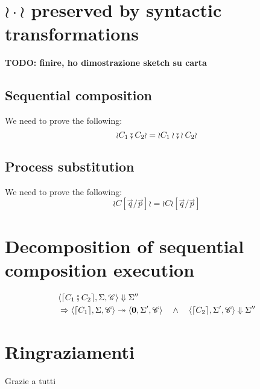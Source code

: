 \documentclass[12pt,a4paper,twoside]{book}
\begin{document}
\begin{appendices}
\chapter{$\wr \cdot \wr$ preserved by syntactic transformations}
\label{appdix:A}
\textbf{TODO: finire, ho dimostrazione sketch su carta}
\section{Sequential composition}
We need to prove the following:
$$\wr C_1 \fatsemi C_2 \wr = \wr C_1 \wr \fatsemi \wr C_2 \wr$$
\section{Process substitution}
We need to prove the following:
$$\wr C [\vec{q}/\vec{p}] \wr = \wr C \wr [\vec{q}/\vec{p}]$$
\chapter{Decomposition of sequential composition execution}
\label{appdix:B}
\begin{align}
\begin{split}
&\langle \lceil C_1 \fatsemi C_2\rceil, \Sigma, \mathscr{C}\rangle \Downarrow \Sigma''\\
&\Rightarrow 
\langle \lceil C_1 \rceil, \Sigma, \mathscr{C} \rangle \twoheadrightarrow \langle \boldsymbol{0}, \Sigma', \mathscr{C} \rangle 
\quad\land\quad
\langle \lceil C_2 \rceil, \Sigma', \mathscr{C} \rangle \Downarrow \Sigma''
\end{split}
\end{align}


\end{appendices}





\chapter*{Ringraziamenti}
Grazie a tutti
\end{document}
